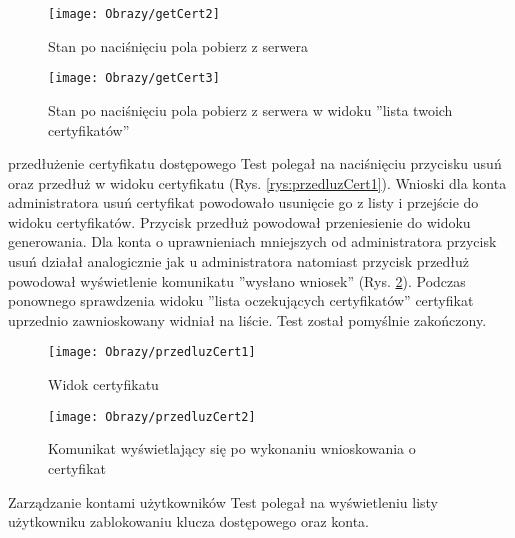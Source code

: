\begin{enumerate*}
\begin{figure}[ht!]
		\begin{minipage}{0.2\textwidth}
			\texttt{[image: Obrazy/getCert2]}
			\caption{Stan po naciśnięciu pola pobierz z serwera }
			\label{rys:getCert2}
		\end{minipage}
		
		
		\begin{minipage}{0.2\textwidth}
			\texttt{[image: Obrazy/getCert3]}
			\caption{Stan po naciśnięciu pola pobierz z serwera w widoku ''lista twoich certyfikatów''}
			\label{rys:getCert3}
		\end{minipage}
		
	
	\end{figure}
	
	

	\item  przedłużenie certyfikatu dostępowego
	Test polegał na naciśnięciu przycisku usuń oraz przedłuż w widoku certyfikatu (Rys. \ref{rys:przedluzCert1}).
	Wnioski dla konta administratora usuń certyfikat powodowało usunięcie go z listy i przejście do widoku certyfikatów. Przycisk przedłuż powodował przeniesienie do widoku generowania. Dla konta o uprawnieniach  mniejszych od administratora przycisk usuń działał analogicznie jak u administratora natomiast przycisk przedłuż powodował wyświetlenie komunikatu ''wysłano wniosek'' (Rys. \ref{rys:przedluzCert2}).
	Podczas ponownego sprawdzenia  widoku ''lista oczekujących certyfikatów'' certyfikat uprzednio zawnioskowany  widniał  na liście. Test został pomyślnie zakończony.
	
	
		\begin{figure}[ht!]
		
		\begin{minipage}{0.2\textwidth}
			\texttt{[image: Obrazy/przedluzCert1]}
			\caption{Widok certyfikatu }
			\label{rys:przedluzCert1}
		\end{minipage}
		
		\begin{minipage}{0.2\textwidth}
			\texttt{[image: Obrazy/przedluzCert2]}
			\caption{Komunikat wyświetlający się po wykonaniu wnioskowania o certyfikat }
			\label{rys:przedluzCert2}
		\end{minipage}
	\end{figure}

\newpage
	\item Zarządzanie kontami użytkowników
		Test polegał na wyświetleniu listy użytkowniku zablokowaniu klucza dostępowego oraz konta.
		

\end{enumerate*}
